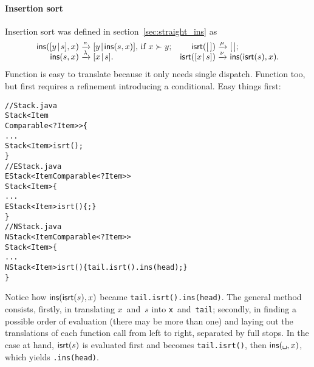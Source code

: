 \paragraph{Insertion sort}

Insertion sort was defined in section~\vref{sec:straight_ins} as
\begin{equation*}
\begin{array}{@{}r@{\;}l@{\;}lr@{\;}l@{\;}l@{}}
  \fun{ins}(\cons{y}{s},x)
& \xrightarrow{\smash{\kappa}}
& \cons{y}{\fun{ins}(s,x)}, \,\text{if \(x \succ y\)};
& \fun{isrt}(\el) 
& \xrightarrow{\smash{\mu}}
& \el;\\
  \fun{ins}(s,x)
& \xrightarrow{\smash{\lambda}}
& \cons{x}{s}.
& \fun{isrt}(\cons{x}{s})
& \xrightarrow{\smash{\nu}} 
& \fun{ins}(\fun{isrt}(s),x).
\end{array}
\end{equation*}
Function  is easy to translate because it only needs
single dispatch. Function  too, but first requires a refinement
introducing a conditional. Easy things first:
\begin{alltt}
// Stack.java
\public \abstractX \class Stack<Item
\hfill\extends Comparable<? \super Item>> \{
  ...
  \public \abstractX Stack<Item> isrt();
\}
// EStack.java
\public \class EStack<Item \extends Comparable<? \super Item>> 
       \extends Stack<Item> \{
  ...
  \public EStack<Item> isrt() \{ \return \this; \}
\}
// NStack.java
\public \class NStack<Item \extends Comparable<? \super Item>>
       \extends Stack<Item> \{
  ...
  \public NStack<Item> isrt() \{\return tail.isrt().ins(head);\}
\}
\end{alltt}
Notice how \(\textsf{ins}(\textsf{isrt}(s),x)\) became
\texttt{tail.isrt().ins(head)}. The general method consists, firstly,
in translating \(x\)~and~\(s\) into \texttt{x}~and~\texttt{tail};
secondly, in finding a possible order of evaluation (there may be more
than one) and laying out the translations of each function call from
left to right, separated by full stops. In the case at hand,
\(\textsf{isrt}(s)\) is evaluated first and becomes \texttt{tail.isrt()},
then \(\fun{ins}(\texttt{\textvisiblespace},x)\), which yields
\texttt{\textvisiblespace.ins(head)}.

